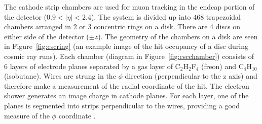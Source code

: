 The cathode strip chambers are used for muon tracking in the endcap portion of the detector ($0.9<|\eta|<2.4$). The system is divided up into 468 trapezoidal chambers arranged in 2 or 3 concentric rings on a disk. There are 4 discs on either side of the detector ($\pm z$). The geometry of the chambers on a disk are seen in Figure~\ref{fig:cscring} (an example image of the hit occupancy of a disc during cosmic ray runs). Each chamber (diagram in Figure~\ref{fig:cscchamber}) consists of 6 layers of electrode planes separated by a gas layer of C$_{2}$H$_{2}$F$_{4}$ (freon) and C$_{4}$H$_{10}$ (isobutane). Wires are strung in the $\phi$ direction (perpendicular to the z axis) and therefore make a measurement of the radial coordinate of the hit. The electron shower generates an image charge in cathode planes. For each layer, one of the planes is segmented into strips perpendicular to the wires, providing a good measure of the $\phi$ coordinate \cite{cscperformance}.

